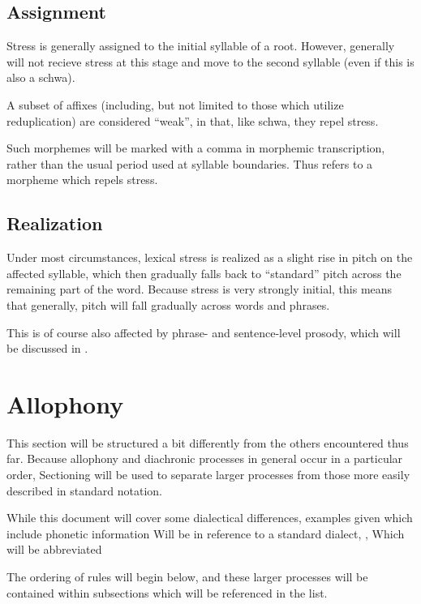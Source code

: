 \subsection{Assignment}
Stress is generally assigned to the initial syllable of a root. However,  generally will not recieve stress at this stage and move to the second syllable (even if this is also a schwa).

A subset of affixes (including, but not limited to those which utilize reduplication) are considered ``weak'', in that, like schwa, they repel stress.

Such morphemes will be marked with a comma in morphemic transcription, rather than the usual period used at syllable boundaries. Thus  refers to a morpheme  which repels stress.

\subsection{Realization}
Under most circumstances, lexical stress is realized as a slight rise in pitch on the affected syllable, which then gradually falls back to ``standard'' pitch across the remaining part of the word. Because stress is very strongly initial, this means that generally, pitch will fall gradually across words and phrases.

This is of course also affected by phrase- and sentence-level prosody, which will be discussed in .

\section{Allophony}
This section will be structured a bit differently from the others encountered thus far. Because allophony and diachronic processes in general occur in a particular order, Sectioning will be used to separate larger processes from those more easily described in standard notation.

While this document will cover some dialectical differences, examples given which include phonetic information Will be in reference to a standard dialect, , Which will be abbreviated 

The ordering of rules will begin below, and these larger processes will be contained within subsections which will be referenced in the list.

